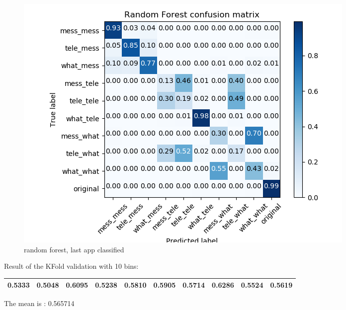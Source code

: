  \begin{figure}[H] 
\centering 
\includegraphics[scale=.6]{images/new_met_rf_initial_double_complete.png} 
\caption{random forest, last app classified} 
\end{figure} 


Result of the KFold validation with 10 bins:
 {\def\arraystretch{1.3} 
 \begin{table}[H] 
\centering 
\begin{tabular}{|l |l |l |l |l |l |l |l |l |l |}  
\hline 
0.5333&
0.5048&
0.6095&
0.5238&
0.5810&
0.5905&
0.5714&
0.6286&
0.5524&
0.5619\\ \hline  

\end{tabular} 
\end{table} }

The mean is : 0.565714